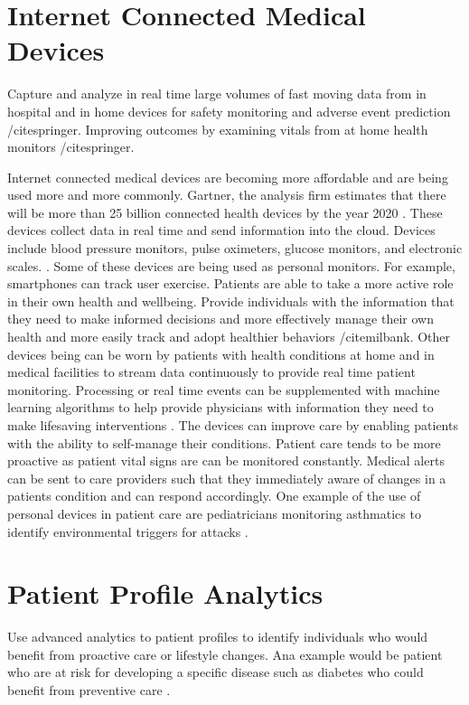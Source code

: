 \documentclass[sigconf]{acmart}
\begin{document}
\section{Internet Connected Medical Devices}
Capture and analyze in real time large volumes of fast moving data from in hospital and in home devices for safety monitoring and adverse event prediction /cite{springer}.
Improving outcomes by examining vitals from at home health monitors /cite{springer}.

Internet connected medical devices are becoming more affordable and are being used more and more commonly.  Gartner, the analysis firm estimates that there will be more than 25 billion connected health devices by the year 2020 \cite{www-google-HlthCat}. These devices collect data in real time and send information into the cloud. Devices include blood pressure monitors, pulse oximeters, glucose monitors, and electronic scales. \cite{www-google-HlthCat}.  Some of these devices are being used as personal monitors. For example, smartphones can track user exercise.  Patients are able to take a more active role in their own health and wellbeing.
Provide individuals with the information that they need to make informed decisions and more effectively manage their own health and more easily track and adopt healthier behaviors /cite{milbank}.
Other devices being can be worn by patients with health conditions at home and in medical facilities to stream data continuously to provide real time patient monitoring.  Processing or real time events can be supplemented with machine learning algorithms to help provide physicians with information they need to make lifesaving interventions \cite{www-google-McDonald}.  The devices can improve care by enabling patients with the ability to self-manage their conditions. Patient care tends to be more proactive as patient vital signs are can be monitored constantly. Medical alerts can be sent to care providers such that they immediately aware of changes in a patients condition and can respond accordingly. One example of the use of personal devices in patient care are pediatricians monitoring asthmatics to identify environmental triggers for attacks \cite{www-google-CIO}.
\section{Patient Profile Analytics}
Use advanced analytics to patient profiles to identify individuals who would benefit from proactive care or lifestyle changes. Ana example would be patient who are at risk for developing a specific disease such as diabetes who could benefit from preventive care \cite{springer}. 
\end{document}
